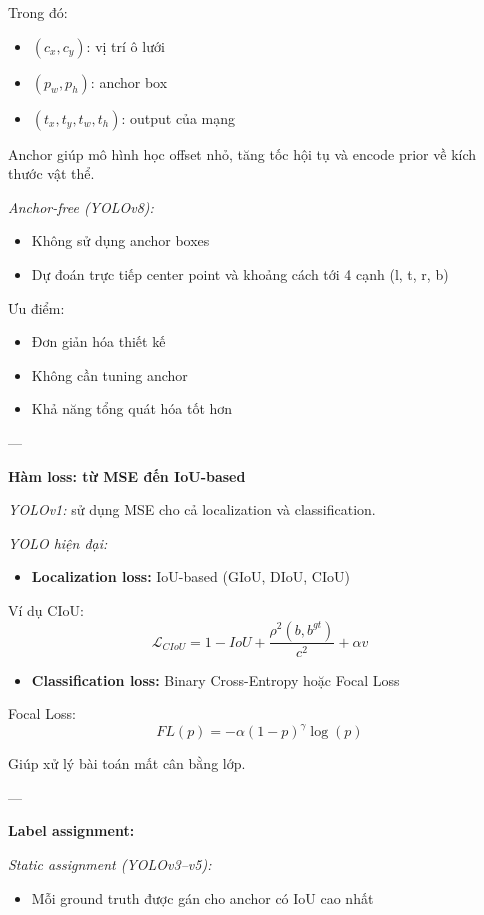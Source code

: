 Trong đó:
\begin{itemize}
\item $(c_x, c_y)$: vị trí ô lưới
\item $(p_w, p_h)$: anchor box
\item $(t_x, t_y, t_w, t_h)$: output của mạng
\end{itemize}

Anchor giúp mô hình học offset nhỏ, tăng tốc hội tụ và encode prior về kích thước vật thể.

\textit{Anchor-free (YOLOv8):}

\begin{itemize}
\item Không sử dụng anchor boxes
\item Dự đoán trực tiếp center point và khoảng cách tới 4 cạnh (l, t, r, b)
\end{itemize}

Ưu điểm:
\begin{itemize}
\item Đơn giản hóa thiết kế
\item Không cần tuning anchor
\item Khả năng tổng quát hóa tốt hơn
\end{itemize}

---

\textbf{Hàm loss: từ MSE đến IoU-based}

\textit{YOLOv1:} sử dụng MSE cho cả localization và classification.

\textit{YOLO hiện đại:}

\begin{itemize}
\item \textbf{Localization loss:} IoU-based (GIoU, DIoU, CIoU)
\end{itemize}

Ví dụ CIoU:
\[
\mathcal{L}_{CIoU} = 1 - IoU + \frac{\rho^2(b, b^{gt})}{c^2} + \alpha v
\]

\begin{itemize}
\item \textbf{Classification loss:} Binary Cross-Entropy hoặc Focal Loss
\end{itemize}

Focal Loss:
\[
FL(p) = -\alpha (1 - p)^\gamma \log(p)
\]

Giúp xử lý bài toán mất cân bằng lớp.

---

\textbf{Label assignment:}

\textit{Static assignment (YOLOv3–v5):}
\begin{itemize}
\item Mỗi ground truth được gán cho anchor có IoU cao nhất
\end{itemize}

